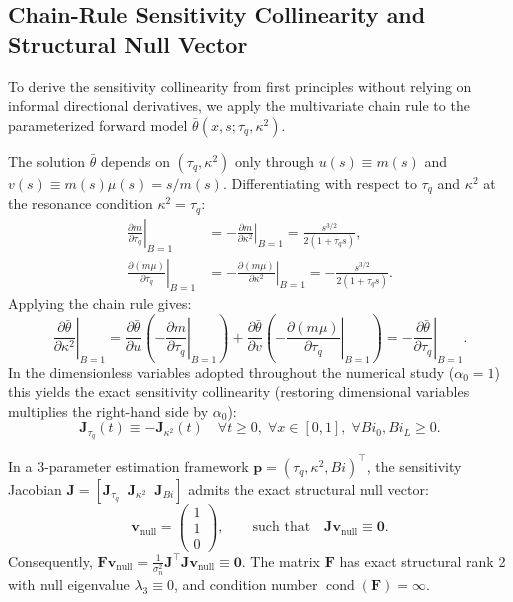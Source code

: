 \documentclass[preprint,12pt]{elsarticle}
\begin{document}
\subsection{Chain-Rule Sensitivity Collinearity and Structural Null Vector}
\label{sec:collinearity_proof}

To derive the sensitivity collinearity from first principles without relying on informal directional derivatives, we apply the multivariate chain rule to the parameterized forward model $\bar{\theta}(x, s; \tau_q, \kappa^2)$.

The solution $\bar{\theta}$ depends on $(\tau_q, \kappa^2)$ only through $u(s) \equiv m(s)$ and $v(s) \equiv m(s)\mu(s) = s / m(s)$. Differentiating with respect to $\tau_q$ and $\kappa^2$ at the resonance condition $\kappa^2 = \tau_q$:
\begin{align}
\left. \frac{\partial m}{\partial \tau_q} \right|_{B=1} &= -\left. \frac{\partial m}{\partial \kappa^2} \right|_{B=1} = \frac{s^{3/2}}{2(1 + \tau_q s)}, \\
\left. \frac{\partial (m\mu)}{\partial \tau_q} \right|_{B=1} &= -\left. \frac{\partial (m\mu)}{\partial \kappa^2} \right|_{B=1} = -\frac{s^{3/2}}{2(1 + \tau_q s)}.
\end{align}
Applying the chain rule gives:
\begin{equation}
\left. \frac{\partial \bar{\theta}}{\partial \kappa^2} \right|_{B=1} = \frac{\partial \bar{\theta}}{\partial u} \left(-\left.\frac{\partial m}{\partial \tau_q}\right|_{B=1}\right) + \frac{\partial \bar{\theta}}{\partial v} \left(-\left.\frac{\partial (m\mu)}{\partial \tau_q}\right|_{B=1}\right) = -\left. \frac{\partial \bar{\theta}}{\partial \tau_q} \right|_{B=1}.
\end{equation}
In the dimensionless variables adopted throughout the numerical study ($\alpha_0 = 1$) this yields the exact sensitivity collinearity (restoring dimensional variables multiplies the right-hand side by $\alpha_0$):
\begin{equation}
\bm{J}_{\tau_q}(t) \equiv -\bm{J}_{\kappa^2}(t) \quad \forall t \ge 0, \; \forall x \in [0, 1], \; \forall Bi_0, Bi_L \ge 0.
\label{eq:collinearity_result}
\end{equation}

In a 3-parameter estimation framework $\bm{p} = (\tau_q, \kappa^2, Bi)^\top$, the sensitivity Jacobian $\bm{J} = [\bm{J}_{\tau_q} \;\; \bm{J}_{\kappa^2} \;\; \bm{J}_{Bi}]$ admits the exact structural null vector:
\begin{equation}
\bm{v}_{\mathrm{null}} = \begin{pmatrix} 1 \\ 1 \\ 0 \end{pmatrix}, \qquad \text{such that} \quad \bm{J} \bm{v}_{\mathrm{null}} \equiv \bm{0}.
\label{eq:null_vector}
\end{equation}
Consequently, $\bm{F} \bm{v}_{\mathrm{null}} = \frac{1}{\sigma_n^2} \bm{J}^\top \bm{J} \bm{v}_{\mathrm{null}} \equiv \bm{0}$. The matrix $\bm{F}$ has exact structural rank 2 with null eigenvalue $\lambda_3 \equiv 0$, and condition number $\operatorname{cond}(\bm{F}) = \infty$.
\end{document}

